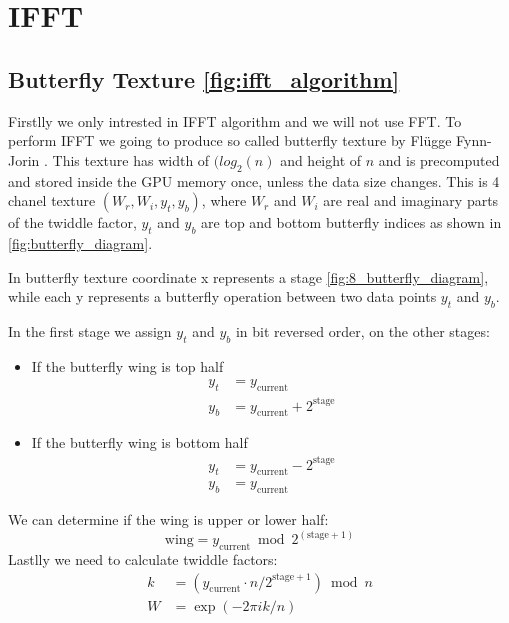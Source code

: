 \section{IFFT}
\subsection{Butterfly Texture \ref{fig:ifft_algorithm}}
Firstlly we only intrested in IFFT algorithm and we will not use FFT.
To perform IFFT we going to produce so called butterfly texture by Fl{\"u}gge Fynn-Jorin \cite{flugge2017}.
This texture has width of $(log_2(n)$ and height of $n$ and is precomputed and stored inside the GPU memory once, unless the data size changes. This is 4 chanel texture $(W_r, W_i, y_t, y_b)$,
where $W_r$ and $W_i$ are real and imaginary parts of the twiddle factor, $y_t$ and $y_b$ are top and bottom butterfly indices as shown in \ref{fig:butterfly_diagram}.

In butterfly texture coordinate x represents a stage \ref{fig:8_butterfly_diagram}, while each y represents a butterfly operation between two data points $y_t$ and $y_b$.

In the first stage we assign $y_t$ and $y_b$ in bit reversed order, on the other stages:
\begin{itemize}
    \item If the butterfly wing is top half
    \begin{equation}
        \begin{split}
            y_t &= y_{\text{current}} \\
            y_b &= y_{\text{current}} + 2^{\text{stage}}
        \end{split}
    \end{equation}
    \item If the butterfly wing is bottom half
    \begin{equation}
        \begin{split}
            y_t &= y_{\text{current}} - 2^{\text{stage}} \\
            y_b &= y_{\text{current}}
        \end{split}
    \end{equation}
\end{itemize}
We can determine if the wing is upper or lower half:
\begin{equation}
    \text{wing} = y_{\text{current}} \bmod 2^{(\text{stage} + 1)}
\end{equation}
Lastlly we need to calculate twiddle factors:
\begin{equation}
    \begin{split}
        k &= (y_{\text{current}} \cdot n / 2^{\text{stage} + 1}) \bmod n \\
        W &= \exp(-2\pi i k / n)
    \end{split}
\end{equation}

